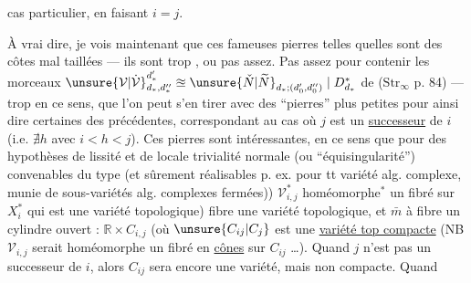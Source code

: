 cas particulier, en faisant $i=j$.

À vrai dire, je vois maintenant que ces fameuses pierres telles quelles sont des côtes mal taillées — ils sont trop , ou pas assez. Pas assez pour contenir les morceaux $\unsure{\mathcal V|\dot{\mathcal V}}_{d_*,d''_*}^{d'_*}\approxeq\unsure{\check N|\widetilde N}_{d_*;(d'_0,d''_0)}\mid D_{d_*}^*$ de ($\mathrm{Str}_\infty$ p. 84) — trop en ce sens, que l'on peut s'en tirer avec des ``pierres'' plus petites pour ainsi dire certaines des précédentes, correspondant au cas où $j$ est un \uline{successeur} de $i$ (i.e. $\nexists h$ avec $i<h<j$).
Ces pierres sont  intéressantes, en ce sens que pour des hypothèses de lissité et de locale trivialité normale (ou ``équisingularité'') convenables du type  (et sûrement réalisables p. ex. pour tt variété alg. complexe, munie de sous-variétés alg. complexes fermées)) $\mathcal V_{i,j}^*$  homéomorphe$ {}^*$  un fibré sur $X_i^*$ \unsure{(}qui est une variété topologique)  fibre une variété topologique, et $\bar m$ à fibre un cylindre ouvert : $\mathbb R\times C_{i,j}$  (où $\unsure{C_{ij}|C_j}$ est une \uline{variété top compacte} (NB $\mathcal V_{i,j}$ serait homéomorphe  un fibré en \uline{cônes} sur $C_{ij}$ \ldots). Quand $j$ n'est pas un successeur de $i$, alors $C_{ij}$ sera encore une variété, mais non compacte. Quand


